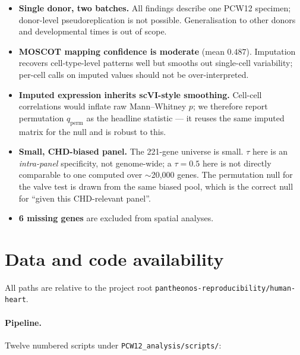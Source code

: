 \documentclass[11pt,a4paper]{article}
\begin{document}
\begin{itemize}[leftmargin=*,itemsep=1pt]
    \item \textbf{Single donor, two batches.} All findings describe one
          PCW12 specimen; donor-level pseudoreplication is not possible.
          Generalisation to other donors and developmental times is out
          of scope.
    \item \textbf{MOSCOT mapping confidence is moderate}
          (mean $0.487$). Imputation recovers cell-type-level patterns
          well but smooths out single-cell variability; per-cell calls
          on imputed values should not be over-interpreted.
    \item \textbf{Imputed expression inherits scVI-style smoothing.}
          Cell-cell correlations would inflate raw Mann--Whitney $p$;
          we therefore report permutation $q_{\text{perm}}$ as the
          headline statistic --- it reuses the same imputed matrix for
          the null and is robust to this.
    \item \textbf{Small, CHD-biased panel.} The 221-gene universe is
          small. $\tau$ here is an \emph{intra-panel} specificity, not
          genome-wide; a $\tau=0.5$ here is not directly comparable to
          one computed over $\sim$20{,}000 genes. The permutation null
          for the valve test is drawn from the same biased pool, which
          is the correct null for ``given this CHD-relevant panel''.
    \item \textbf{6 missing genes} are excluded from spatial analyses.
\end{itemize}

\section*{Data and code availability}

All paths are relative to the project root
\texttt{pantheonos-reproducibility/human-heart}.

\paragraph{Pipeline.} Twelve numbered scripts under
\texttt{PCW12\_analysis/scripts/}:
\end{document}
